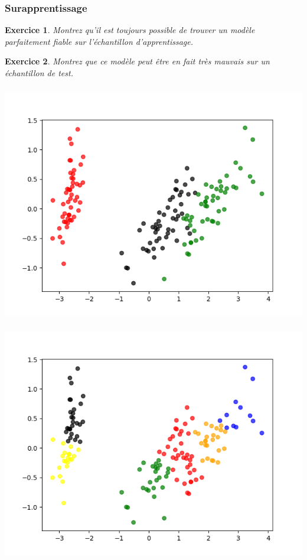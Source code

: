 \documentclass[11pt]{beamer}
\newenvironment{slide}[1]{%
\begin{frame}[environment=slide]
\frametitle{#1}
}{%
\end{frame}
}
\newtheorem{exercice}{Exercice}
\begin{document}
\begin{slide}{Surapprentissage}

\begin{exercice}
Montrez qu'il est toujours possible de trouver un modèle parfaitement fiable sur l'échantillon d'apprentissage.
\end{exercice}

\pause

\begin{exercice}
Montrez que ce modèle peut être en fait très mauvais sur un échantillon de test.
\end{exercice}

\end{slide}

\begin{slide}{}

\includegraphics[scale=0.5]{A8classif}

\end{slide}


\begin{slide}{}

\includegraphics[scale=0.5]{iris_surapprentissage}

\end{slide}
\end{document}
